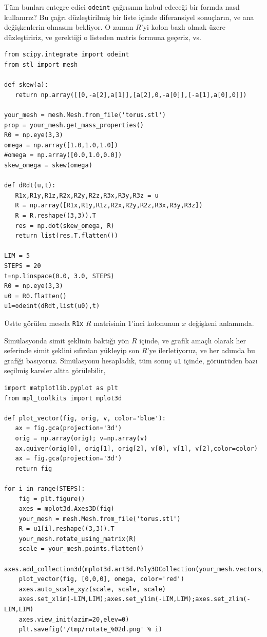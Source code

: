 \documentclass[12pt,fleqn]{article}\usepackage{../../common}
\begin{document}
Tüm bunları entegre edici \verb!odeint! çağrısının kabul edeceği bir formda
nasıl kullanırız? Bu çağrı düzleştirilmiş bir liste içinde diferansiyel
sonuçların, ve ana değişkenlerin olmasını bekliyor. O zaman $R$'yi kolon bazlı
olmak üzere düzleştiririz, ve gerektiği o listeden matris formuna geçeriz, vs.

\begin{verbatim}
from scipy.integrate import odeint
from stl import mesh

def skew(a):
   return np.array([[0,-a[2],a[1]],[a[2],0,-a[0]],[-a[1],a[0],0]])

your_mesh = mesh.Mesh.from_file('torus.stl')
prop = your_mesh.get_mass_properties()
R0 = np.eye(3,3)
omega = np.array([1.0,1.0,1.0])
#omega = np.array([0.0,1.0,0.0])
skew_omega = skew(omega)
   
def dRdt(u,t):   
   R1x,R1y,R1z,R2x,R2y,R2z,R3x,R3y,R3z = u
   R = np.array([R1x,R1y,R1z,R2x,R2y,R2z,R3x,R3y,R3z])
   R = R.reshape((3,3)).T
   res = np.dot(skew_omega, R)
   return list(res.T.flatten())

LIM = 5
STEPS = 20
t=np.linspace(0.0, 3.0, STEPS)
R0 = np.eye(3,3)
u0 = R0.flatten()
u1=odeint(dRdt,list(u0),t)
\end{verbatim}

Üstte görülen mesela \verb!R1x! $R$ matrisinin 1'inci kolonunun $x$ değişkeni
anlamında.

Simülasyonda simit şeklinin baktığı yön $R$ içinde, ve grafik amaçlı olarak her
seferinde simit şeklini sıfırdan yükleyip son $R$'ye ilerletiyoruz, ve her
adımda bu grafiği basıyoruz. Simülasyonu hesapladık, tüm sonuç \verb!u1!
içinde, görüntüden bazı seçilmiş kareler altta görülebilir,

\begin{verbatim}
import matplotlib.pyplot as plt
from mpl_toolkits import mplot3d

def plot_vector(fig, orig, v, color='blue'):
   ax = fig.gca(projection='3d')
   orig = np.array(orig); v=np.array(v)
   ax.quiver(orig[0], orig[1], orig[2], v[0], v[1], v[2],color=color)
   ax = fig.gca(projection='3d')  
   return fig

for i in range(STEPS):
    fig = plt.figure()
    axes = mplot3d.Axes3D(fig)
    your_mesh = mesh.Mesh.from_file('torus.stl')
    R = u1[i].reshape((3,3)).T
    your_mesh.rotate_using_matrix(R)
    scale = your_mesh.points.flatten()
    axes.add_collection3d(mplot3d.art3d.Poly3DCollection(your_mesh.vectors,alpha=0.3))
    plot_vector(fig, [0,0,0], omega, color='red')
    axes.auto_scale_xyz(scale, scale, scale)
    axes.set_xlim(-LIM,LIM);axes.set_ylim(-LIM,LIM);axes.set_zlim(-LIM,LIM)
    axes.view_init(azim=20,elev=0)
    plt.savefig('/tmp/rotate_%02d.png' % i)  
\end{verbatim}
\end{document}
